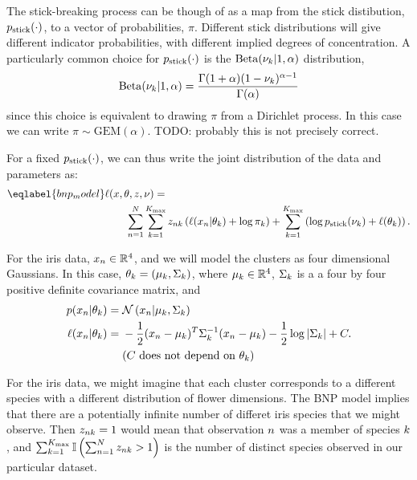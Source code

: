 The stick-breaking process can be though of as a map from  the stick
distibution, $p_{\mathrm{stick}}(\cdot)$, to a vector of probabilities, $\pi$. Different
stick distributions will give different indicator probabilities, with different
implied degrees of concentration.  A particularly common choice for
$p_{\mathrm{stick}}(\cdot)$ is the $\mathrm{Beta}(\nu_{k} \vert 1, \alpha)$ distribution,
%
\begin{align*}
%
\mathrm{Beta}(\nuk \vert 1, \alpha) =
    \frac{\Gamma(1 + \alpha) (1 - \nuk)^{\alpha - 1}}
         {\Gamma(\alpha)}
%
\end{align*}
%
since this choice is equivalent to drawing $\pi$ from a Dirichlet process.
In this case we can write $\pi \sim \mathrm{GEM}(\alpha)$.  TODO: probably
this is not precisely correct.

For a fixed $p_{\mathrm{stick}}(\cdot)$, we can thus write the joint distribution of
the data and parameters as:
%
\begin{align}\eqlabel{bnp_model}
%
\MoveEqLeft
\logp(\x, \theta, \z, \nu) ={}
\nonumber\\&
    \sum_{n=1}^N \sum_{k=1}^{\kmax}
        \z_{\n\k} \left(
            \logp(\x_n \vert \theta_\k) + \log \pi_\k
        \right) +
    \sum_{k=1}^{\kmax} \left(
        \log \pstick(\nuk) + \logp(\theta_\k)
    \right).
%
\end{align}
%

\begin{ex}
%
For the iris data, $x_n \in \mathbb{R}^4$, and we will model the clusters as
four dimensional Gaussians.  In this case, $\theta_k = (\mu_k, \Sigma_k)$,
where $\mu_k \in \mathbb{R}^4$, $\Sigma_k$ is a a four by four positive
definite covariance matrix, and
%
\begin{align*}
%
p(\x_\n \vert \theta_\k) ={}& \normdist{\x_n \vert \mu_\k, \Sigma_\k} \\
\logp(\x_\n \vert \theta_\k) ={}&
    -\frac{1}{2}(\x_n - \mu_k)^T \Sigma_\k^{-1} (\x_n - \mu_k)
    -\frac{1}{2} \log |\Sigma_\k| + \const.\\
    & \constdesc{\theta_\k}
%
\end{align*}

For the iris data, we might imagine that each cluster corresponds to a different
species with a different distribution of flower dimensions.  The BNP model
implies that there are a potentially infinite number of differet iris species
that we might observe.  Then $z_{nk} = 1$ would mean that observation $n$
was a member of species $k$, and $\sum_{k=1}^{K_{\mathrm{max}}} \mathbb{I}\left( \sum_{n=1}^{N}
z_{nk} > 1\right)$ is the number of distinct species observed in our particular
dataset.
%
\end{ex}
